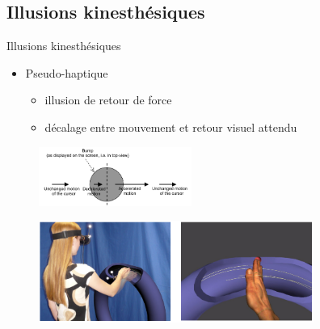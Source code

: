 \subsection{Illusions kinesthésiques}
\begin{frame}{Illusions kinesthésiques}
\begin{multicols}{2}
\begin{itemize}
\item Pseudo-haptique
\begin{itemize}
\item illusion de retour de force
\item décalage entre mouvement et retour visuel attendu
\end{itemize}
\end{itemize}
\begin{figure}
\centering
\includegraphics[width=5cm]{images/pseudoHaptic}
\caption{\cite{Lecuyer2009}}
\end{figure}
\end{multicols}
\begin{figure}
\centering
\includegraphics[width=9cm]{images/pseudoHaptic3D}
\caption{\cite{Pusch2008}}
\end{figure}
\end{frame}

